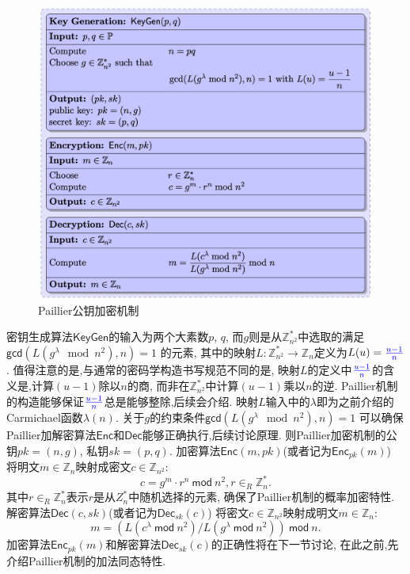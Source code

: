 \documentclass{article}
\newcommand{\Z}{\mathbb{Z}}
\newcommand{\blue}{\textcolor{blue}}
\begin{document}
\begin{figure}[h]
\centering
\includegraphics[width=\textwidth]{paillier.png}
\caption{Paillier公钥加密机制}\label{fig-paillier}
\end{figure}

密钥生成算法$\textsf{KeyGen}$的输入为两个大素数$p$, $q$,
而$g$则是从$\Z_{n^2}^*$中选取的满足
$\textsf{gcd}\left(L\left(g^\lambda \mod n^2\right), n\right) = 1$
的元素, 其中的映射$L: \Z_{n^2}^* \rightarrow \Z_n$定义为$L(u) = \blue{\frac{u-1}{n}}$.
值得注意的是,与通常的密码学构造书写规范不同的是,
映射$L$的定义中$\blue{\frac{u-1}{n}}$的含义是,计算$(u-1)$除以$n$的商,
而非在$\Z_{n^2}^*$中计算$(u-1)$乘以$n$的逆. 
Paillier机制的构造能够保证$\blue{\frac{u-1}{n}}$总是能够整除,后续会介绍.
映射$L$输入中的$\lambda$即为之前介绍的Carmichael函数$\lambda(n)$.
关于$g$的约束条件$\textsf{gcd}\left(L\left(g^\lambda \mod n^2\right), n\right) = 1$
可以确保Paillier加解密算法$\textsf{Enc}$和$\textsf{Dec}$能够正确执行,后续讨论原理.
则Paillier加密机制的公钥$pk = (n, g)$, 私钥$sk = (p, q)$.
加密算法$\textsf{Enc}(m, pk)$(或者记为$\textsf{Enc}_{pk}(m)$)
将明文$m\in\Z_n$映射成密文$c\in\Z_{n^2}$:
$$
c = g^m \cdot r^n ~\textsf{mod}~ n^2, r\in_R\Z_n^*.
$$
其中$r\in_R\Z_n^*$表示$r$是从$Z_n^*$中随机选择的元素, 确保了Paillier机制的概率加密特性.
解密算法$\textsf{Dec}(c, sk)$(或者记为$\textsf{Dec}_{sk}(c)$)
将密文$c\in\Z_{n^2}$映射成明文$m\in\Z_n$:
$$
m = \left(L(c^{\lambda}~\textsf{mod}~n^2) / L(g^{\lambda}~\textsf{mod}~n^2)\right)~\textsf{mod}~n.
$$
加密算法$\textsf{Enc}_{pk}(m)$和解密算法$\textsf{Dec}_{sk}(c)$的正确性将在下一节讨论,
在此之前,先介绍Paillier机制的加法同态特性.
\end{document}
